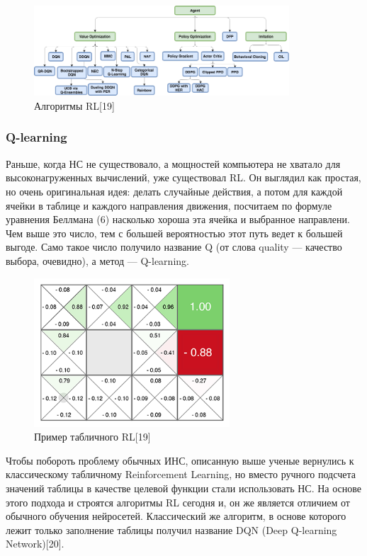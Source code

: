 \documentclass[bachelor, och, coursework]{shiza}
\begin{document}
\begin{figure}[H]
    \centering
    \includegraphics[width=0.85\textwidth]{pic/9}
    \caption{Алгоритмы RL[19]}
    \label{fig:img1}
\end{figure}

\subsubsection{Q-learning}
Раньше, когда НС не существовало, а мощностей компьютера не хватало для высоконагруженных вычислений, уже существовал RL. Он выглядил как простая, но очень оригинальная идея:
делать случайные действия, а потом для каждой ячейки в таблице и каждого направления движения, посчитаем по формуле уравнения Беллмана (6) насколько хороша эта ячейка и выбранное направлени. Чем
выше это число, тем с большей вероятностью этот путь ведет к большей выгоде. Само такое число получило название Q (от слова quality — качество выбора, очевидно), а метод —
Q-learning.
\begin{figure}[H]
    \centering
    \includegraphics[width=0.65\textwidth]{pic/8}
    \caption{Пример табличного RL[19]}
    \label{fig:img1}
\end{figure}
Чтобы побороть проблему обычных ИНС, описанную выше ученые вернулись к классическому табличному Reinforcement Learning, но вместо ручного подсчета значений таблицы в качестве
целевой функции стали использовать НС. На основе этого подхода и строятся алгоритмы RL сегодня и, он же является отличием от обычного обучения нейросетей. Классический же
алгоритм, в основе которого лежит только заполнение таблицы получил название DQN (Deep Q-learning Network)[20].
\end{document}
